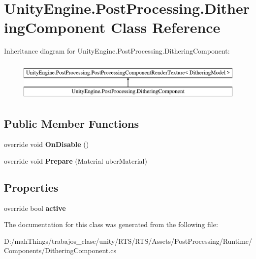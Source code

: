 \hypertarget{class_unity_engine_1_1_post_processing_1_1_dithering_component}{}\section{Unity\+Engine.\+Post\+Processing.\+Dithering\+Component Class Reference}
\label{class_unity_engine_1_1_post_processing_1_1_dithering_component}
Inheritance diagram for Unity\+Engine.\+Post\+Processing.\+Dithering\+Component\+:\begin{figure}[H]
\begin{center}
\leavevmode
\includegraphics[height=2.000000cm]{class_unity_engine_1_1_post_processing_1_1_dithering_component}
\end{center}
\end{figure}
\subsection*{Public Member Functions}
\begin{DoxyCompactItemize}
\item 
\mbox{\label{class_unity_engine_1_1_post_processing_1_1_dithering_component_a3972d813f7d1913798fc142e53d8b352}} 
override void {\bfseries On\+Disable} ()
\item 
\mbox{\label{class_unity_engine_1_1_post_processing_1_1_dithering_component_af47fb039901b2434cfe5cd377cf559be}} 
override void {\bfseries Prepare} (Material uber\+Material)
\end{DoxyCompactItemize}
\subsection*{Properties}
\begin{DoxyCompactItemize}
\item 
\mbox{\label{class_unity_engine_1_1_post_processing_1_1_dithering_component_a53ebd6ecdc65f309abd3d0cf47caecf3}} 
override bool {\bfseries active}
\end{DoxyCompactItemize}


The documentation for this class was generated from the following file\+:\begin{DoxyCompactItemize}
\item 
D\+:/mah\+Things/trabajos\+\_\+clase/unity/\+R\+T\+S/\+R\+T\+S/\+Assets/\+Post\+Processing/\+Runtime/\+Components/Dithering\+Component.\+cs\end{DoxyCompactItemize}
